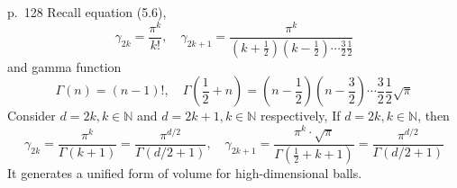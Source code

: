 \begin{note}{p.~128}
    Recall equation (5.6),
    \[
    \gamma_{2k}=\frac{\pi^k}{k!},\quad \gamma_{2k+1}=\frac{\pi^k}{(k+\frac{1}{2})(k-\frac{1}{2})\cdots \frac{3}{2}\frac{1}{2}}
    \]
    and gamma function
    \[
    \Gamma(n)=(n-1)!,\quad \Gamma(\frac{1}{2}+n)=(n-\frac{1}{2})(n-\frac{3}{2})\cdots \frac{3}{2}\frac{1}{2}\sqrt{\pi}
    \]
    Consider $d=2k,k\in\mathbb{N}$ and $d=2k+1,k\in\mathbb{N}$ respectively,
    If $d=2k,k\in\mathbb{N}$, then 
    \[
    \gamma_{2k}=\frac{\pi^k}{\Gamma(k+1)}=\frac{\pi^{d/2}}{\Gamma(d/2+1)},\quad \gamma_{2k+1}=\frac{\pi^k\cdot\sqrt{\pi}}{\Gamma(\frac{1}{2}+k+1)}=\frac{\pi^{d/2}}{\Gamma(d/2+1)}
    \]
    It generates a unified form of volume for high-dimensional balls.
\end{note}